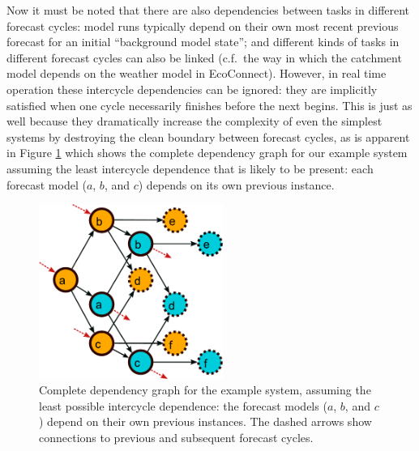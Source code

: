 \documentclass[11pt,a4paper]{article}
\begin{document}
Now it must be noted that there are also dependencies between tasks in
different forecast cycles: model runs typically depend on their own most
recent previous forecast for an initial ``background model state''; and
different kinds of tasks in different forecast cycles can also be linked
(c.f.\ the way in which the catchment model depends on the weather model
in EcoConnect). However, in real time operation these intercycle
dependencies can be ignored: they are implicitly satisfied when one
cycle necessarily finishes before the next begins. This is just as well
because they dramatically increase the complexity of even the simplest
systems by destroying the clean boundary between forecast cycles, as is
apparent in Figure \ref{fig-dep-two} which shows the complete dependency
graph for our example system assuming the least intercycle dependence
that is likely to be present: each forecast model ($a$, $b$, and $c$)
depends on its own previous instance.

\begin{figure} \begin{center}
    \includegraphics[width=6cm]{dependencies-two} \end{center}
    \caption{\small Complete dependency graph for the example
    system, assuming the least possible intercycle dependence: the
    forecast models ($a$, $b$, and $c$) depend on their own previous
    instances. The dashed arrows show connections to previous and
    subsequent forecast cycles.} 
    \label{fig-dep-two}
\end{figure}
\end{document}

